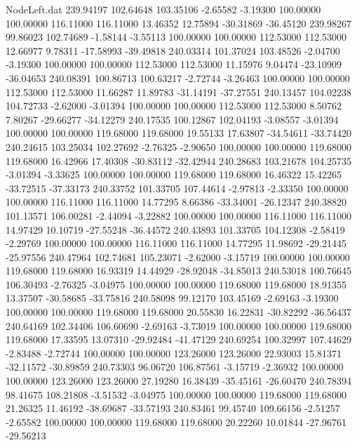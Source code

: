 \begin{filecontents}{NodeLeft.dat}
 239.94197  102.64648  103.35106    -2.65582   -3.19300  100.00000  100.00000  116.11000  116.11000   13.46352   12.75894  -30.31869  -36.45120
 239.98267   99.86023  102.74689    -1.58144   -3.55113  100.00000  100.00000  112.53000  112.53000   12.66977    9.78311  -17.58993  -39.49818
 240.03314  101.37024  103.48526    -2.04700   -3.19300  100.00000  100.00000  112.53000  112.53000   11.15976    9.04474  -23.10909  -36.04653
 240.08391  100.86713  100.63217    -2.72744   -3.26463  100.00000  100.00000  112.53000  112.53000   11.66287   11.89783  -31.14191  -37.27551
 240.13457  104.02238  104.72733    -2.62000   -3.01394  100.00000  100.00000  112.53000  112.53000    8.50762    7.80267  -29.66277  -34.12279
 240.17535  100.12867  102.04193    -3.08557   -3.01394  100.00000  100.00000  119.68000  119.68000   19.55133   17.63807  -34.54611  -33.74420
 240.24615  103.25034  102.27692    -2.76325   -2.90650  100.00000  100.00000  119.68000  119.68000   16.42966   17.40308  -30.83112  -32.42944
 240.28683  103.21678  104.25735    -3.01394   -3.33625  100.00000  100.00000  119.68000  119.68000   16.46322   15.42265  -33.72515  -37.33173
 240.33752  101.33705  107.44614    -2.97813   -2.33350  100.00000  100.00000  116.11000  116.11000   14.77295    8.66386  -33.34001  -26.12347
 240.38820  101.13571  106.00281    -2.44094   -3.22882  100.00000  100.00000  116.11000  116.11000   14.97429   10.10719  -27.55248  -36.44572
 240.43893  101.33705  104.12308    -2.58419   -2.29769  100.00000  100.00000  116.11000  116.11000   14.77295   11.98692  -29.21445  -25.97556
 240.47964  102.74681  105.23071    -2.62000   -3.15719  100.00000  100.00000  119.68000  119.68000   16.93319   14.44929  -28.92048  -34.85013
 240.53018  100.76645  106.30493    -2.76325   -3.04975  100.00000  100.00000  119.68000  119.68000   18.91355   13.37507  -30.58685  -33.75816
 240.58098   99.12170  103.45169    -2.69163   -3.19300  100.00000  100.00000  119.68000  119.68000   20.55830   16.22831  -30.82292  -36.56437
 240.64169  102.34406  106.60690    -2.69163   -3.73019  100.00000  100.00000  119.68000  119.68000   17.33595   13.07310  -29.92484  -41.47129
 240.69254  100.32997  107.44629    -2.83488   -2.72744  100.00000  100.00000  123.26000  123.26000   22.93003   15.81371  -32.11572  -30.89859
 240.73303   96.06720  106.87561    -3.15719   -2.36932  100.00000  100.00000  123.26000  123.26000   27.19280   16.38439  -35.45161  -26.60470
 240.78394   98.41675  108.21808    -3.51532   -3.04975  100.00000  100.00000  119.68000  119.68000   21.26325   11.46192  -38.69687  -33.57193
 240.83461   99.45740  109.66156    -2.51257   -2.65582  100.00000  100.00000  119.68000  119.68000   20.22260   10.01844  -27.96761  -29.56213

\end{filecontents}
